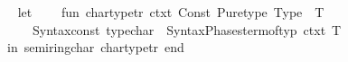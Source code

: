\begin{isabellebody}
%
\isadelimML
\isanewline
%
\endisadelimML
%
\isatagML
{}\isamarkupfalse%
\ {\isacartoucheopen}\isanewline
\ \ let\isanewline
\ \ \ \ fun\ char{\isacharunderscore}{\kern0pt}type{\isacharunderscore}{\kern0pt}tr{\isacharprime}{\kern0pt}\ ctxt\ {\isacharbrackleft}{\kern0pt}Const\ {\isacharparenleft}{\kern0pt}\isactrlconstUNDERSCOREsyntax {\isasymopen}Pure{\isachardot}{\kern0pt}type{\isasymclose}{\isacharcomma}{\kern0pt}\ Type\ {\isacharparenleft}{\kern0pt}{\isacharunderscore}{\kern0pt}{\isacharcomma}{\kern0pt}\ {\isacharbrackleft}{\kern0pt}T{\isacharbrackright}{\kern0pt}{\isacharparenright}{\kern0pt}{\isacharparenright}{\kern0pt}{\isacharbrackright}{\kern0pt}\ {\isacharequal}{\kern0pt}\isanewline
\ \ \ \ \ \ Syntax{\isachardot}{\kern0pt}const\ \isactrlsyntaxUNDERSCOREconst {\isasymopen}{\isacharunderscore}{\kern0pt}type{\isacharunderscore}{\kern0pt}char{\isasymclose}\ {\isachardollar}{\kern0pt}\ Syntax{\isacharunderscore}{\kern0pt}Phases{\isachardot}{\kern0pt}term{\isacharunderscore}{\kern0pt}of{\isacharunderscore}{\kern0pt}typ\ ctxt\ T\isanewline
\ \ in\ {\isacharbrackleft}{\kern0pt}{\isacharparenleft}{\kern0pt}\isactrlconstUNDERSCOREsyntax {\isasymopen}semiring{\isacharunderscore}{\kern0pt}char{\isasymclose}{\isacharcomma}{\kern0pt}\ char{\isacharunderscore}{\kern0pt}type{\isacharunderscore}{\kern0pt}tr{\isacharprime}{\kern0pt}{\isacharparenright}{\kern0pt}{\isacharbrackright}{\kern0pt}\ end\isanewline
{\isacartoucheclose}%
\endisatagML
{\isafoldML}%
%
\isadelimML
\isanewline
%
\endisadelimML
%
\isadelimtheory
\isanewline
%
\endisadelimtheory
%
\isatagtheory
{}\isamarkupfalse%
%
\endisatagtheory
{\isafoldtheory}%
%
\isadelimtheory
%
\endisadelimtheory
%
\end{isabellebody}%
\endinput

